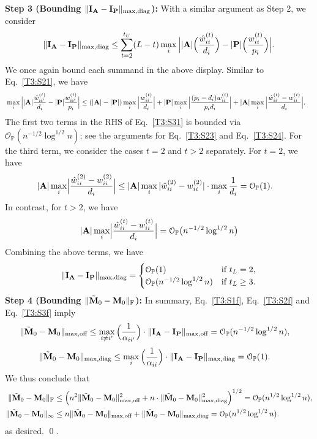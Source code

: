\documentclass[10pt,journal,compsoc]{IEEEtran}
\newcommand{\op}{\mathcal{O}_{\mathbb{P}}}
\newcommand{\ee}{\end{aligned} \end{equation}}
\newcommand{\BL}{\Big (}
\newcommand{\BR}{\Big )}
\newcommand{\bee}{\begin{equation}\begin{aligned}}
\newcommand{\M}[1]{{{\mathbf{\MakeUppercase{#1}}}}}
\newcommand{\F}{\mathrm{F}}
\numberwithin{equation}{section}
\begin{document}
\noindent\textbf{Step 3 (Bounding $\|\M I_{\M A} - \M I_{\M P}\|_{\max,\mathrm{diag}}$):} 
With a similar argument as {Step 2}, we consider 
\bee\label{T3:S33}
\|\M I_{\M A} - \M I_{\M P}\|_{\max,\text{diag}} 
\leq  \sum_{t =
  2}^{t_U} (L - t)\max_{i}\Big||\M A|\Big(\frac{\hat{w}_{ii}^{(t)}}{d_i}\Big)- |\M P|\Big(\frac{{w}_{ii}^{(t)}}{p_i}\Big)\Big|.
\ee
We once again bound each summand in the above display. Similar to Eq.~\eqref{T3:S21}, we have
\bee\label{T3:S31}
&\max_{i}\Big||\M A|  \frac{\hat{w}_{ii'}^{(t)}}{d_i}-
|\M P|  \frac{{w}_{ii'}^{(t)}}{p_i}\Bigr| 
\leq (|\M A| - |\M
P|)  \max_{i}\Big| \frac{w^{(t)}_{ii}}{d_i}\Big|
+ |\M P|  \max_{i}\Big|\frac{(p_i - d_i)w^{(t)}_{ii}}{p_i d_i}
\Big| + |\M A|  \max_{i}\Big|\frac{\hat{w}_{ii}^{(t)} - w_{ii}^{(t)}}{d_i}\Big|.
\ee
The first two terms in the RHS of Eq.~\eqref{T3:S31} is bounded via
$\op(n^{-1/2}\log^{1/2}{n})$; see the arguments for
  Eq.~\eqref{T3:S23} and Eq.~\eqref{T3:S24}. For the third term, we
  consider the cases $t = 2$ and $t > 2$ separately. For $t = 2$, we have
\bee\nonumber
|\M A| \max_{i}\Bigl|\frac{\hat{w}_{ii}^{(2)} -
  w_{ii}^{(2)}}{d_i}\Big| &\leq |\M A| \max_{i}|\hat{w}_{ii}^{(2)} - w^{(2)}_{ii}|\cdot \max_{i}\frac{1}{d_i}
= \op(1).
\ee
In contrast, for $t > 2$, we have
\bee\nonumber
|\M A| \max_{i}\Bigl|\frac{\hat{w}_{ii}^{(t)} -
  w_{ii}^{(t)}}{d_i}\Big| = 
\op\big(n^{-1/2} \log^{1/2}{n}\big)
\ee
Combining the above terms, we have
\bee\label{T3:S3f}
\|\M I_{\M A} - \M I_{\M P}\|_{\max,\text{diag}} = \begin{cases}
  \op(1) & \text{if $t_L = 2$}, \\
  \op(n^{-1/2} \log^{1/2}{n}) & \text{if $t_L \geq 3$}. \end{cases}
\ee
\textbf{Step 4 (Bounding $\|\tilde{\M M}_0 - \M M_0\|_{\F}$):}
In summary, Eq.~\eqref{T3:S1f}, Eq.~\eqref{T3:S2f} and Eq.~\eqref{T3:S3f} imply
\bee
\|\tilde{\M M}_0 - \M M_0\|_{\max,\text{off}} &\leq\max_{i \not = i'} \Big(\frac{1}{\alpha_{ii'}}\Big)\cdot \|\M I_{\M A} -
\M I_{\M P}\|_{\max,\text{off}} 
= \op(n^{-1/2}\log^{1/2}{n}), 
\ee
\bee
\|\tilde{\M M}_0 - \M M_0\|_{\max,\text{diag}}
&\leq\max_{i}\Big(\frac{1}{\alpha_{ii}}\Big)\cdot \|\M I_{\M A} - \M
I_{\M P}\|_{\max,\text{diag}} 
= \op(1).
\ee
We thus conclude that
\bee
\|\tilde{\M M}_0-\M M_0\|_{\F} 
&\leq \BL n^2 \|\tilde{\M M}_0 -
\M M_0\|^2_{\max,\text{off}} + n\cdot \|\tilde{\M M}_0 - \M
M_0\|^2_{\max,\text{diag}}  \BR^{1/2} 
= \op(n^{1/2}\log^{1/2}{n}),
\\
\|\tilde{\M M}_0-\M M_0\|_{\infty} 
&\leq n \|\tilde{\M M}_0 -
\M M_0\|_{\max,\text{off}} +  \|\tilde{\M M}_0 - \M
M_0\|_{\max,\text{diag}}  
= \op(n^{1/2}\log^{1/2}{n}).
\ee
 as desired.
 \qed.
\end{document}
